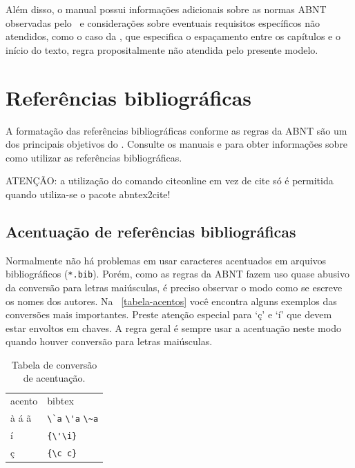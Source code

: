 Além disso, o manual possui informações adicionais sobre as normas ABNT
observadas pelo \abnTeX\ e considerações sobre eventuais requisitos específicos
não atendidos, como o caso da , que
especifica o espaçamento entre os capítulos e o início do texto, regra
propositalmente não atendida pelo presente modelo.

\section{Referências bibliográficas}

A formatação das referências bibliográficas conforme as regras da ABNT são um
dos principais objetivos do \abnTeX. Consulte os manuais
 e  para obter informações
sobre como utilizar as referências bibliográficas.

ATENÇÃO: a utilização do comando \textsf{citeonline} em vez de \textsf{cite} só
é permitida quando utiliza-se o pacote \textsf{abntex2cite}!

\subsection{Acentuação de referências bibliográficas}

Normalmente não há problemas em usar caracteres acentuados em arquivos
bibliográficos (\texttt{*.bib}). Porém, como as regras da ABNT fazem uso quase
abusivo da conversão para letras maiúsculas, é preciso observar o modo como se
escreve os nomes dos autores. Na ~\autoref{tabela-acentos} você encontra alguns
exemplos das conversões mais importantes. Preste atenção especial para `ç' e `í'
que devem estar envoltos em chaves. A regra geral é sempre usar a acentuação
neste modo quando houver conversão para letras maiúsculas.
\begin{table}[htbp]
\caption{Tabela de conversão de acentuação.}
\label{tabela-acentos}
\begin{center}
\begin{tabular}{ll}\hline\hline
acento & \textsf{bibtex}\\
à á ã & \verb+\`a+ \verb+\'a+ \verb+\~a+\\
í & \verb+{\'\i}+\\
ç & \verb+{\c c}+\\
\hline\hline
\end{tabular}
\end{center}
\end{table}

